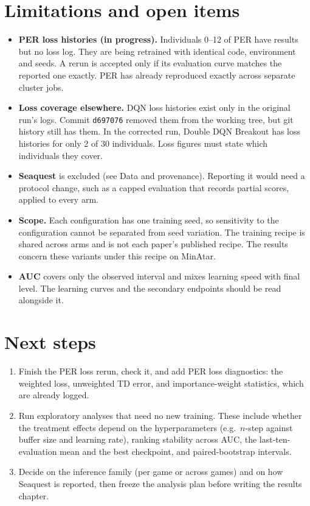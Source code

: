 \documentclass[11pt,a4paper]{article}
\begin{document}
\section*{Limitations and open items}
\begin{itemize}
    \item \textbf{PER loss histories (in progress).} Individuals 0--12 of PER
    have results but no loss log. They are being retrained with identical
    code, environment and seeds. A rerun is accepted only if its evaluation
    curve matches the reported one exactly. PER has already reproduced
    exactly across separate cluster jobs.
    \item \textbf{Loss coverage elsewhere.} DQN loss histories exist only in
    the original run's logs. Commit \texttt{d697076} removed them from the
    working tree, but git history still has them. In the corrected run,
    Double DQN Breakout has loss histories for only 2 of 30 individuals.
    Loss figures must state which individuals they cover.
    \item \textbf{Seaquest} is excluded (see Data and provenance). Reporting it
    would need a protocol change, such as a capped evaluation that records
    partial scores, applied to every arm.
    \item \textbf{Scope.} Each configuration has one training seed, so
    sensitivity to the configuration cannot be separated from seed variation.
    The training recipe is shared across arms and is not each paper's
    published recipe. The results concern these variants under this recipe
    on MinAtar.
    \item \textbf{AUC} covers only the observed interval and mixes learning
    speed with final level. The learning curves and the secondary endpoints
    should be read alongside it.
\end{itemize}

\section*{Next steps}
\begin{enumerate}
    \item Finish the PER loss rerun, check it, and add PER loss diagnostics:
    the weighted loss, unweighted TD error, and importance-weight statistics,
    which are already logged.
    \item Run exploratory analyses that need no new training. These include
    whether the treatment effects depend on the hyperparameters (e.g.\
    $n$-step against buffer size and learning rate), ranking stability
    across AUC, the last-ten-evaluation mean and the best checkpoint, and
    paired-bootstrap intervals.
    \item Decide on the inference family (per game or across games) and on
    how Seaquest is reported, then freeze the analysis plan before writing
    the results chapter.
\end{enumerate}
\end{document}
